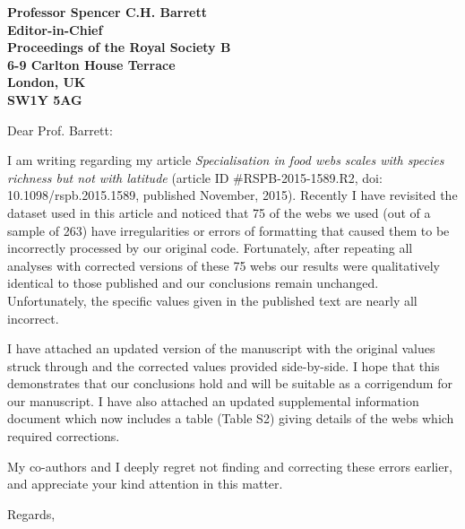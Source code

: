 \documentclass[12pt]{letter}
\begin{document}
\begin{letter}{\bf Professor Spencer C.H. Barrett\\
               Editor-in-Chief\\
               Proceedings of the Royal Society B\\
               6-9 Carlton House Terrace\\
               London, UK\\
               SW1Y 5AG\\
                }

\opening{Dear Prof. Barrett:}

I am writing regarding my article \emph{Specialisation in food webs scales with species richness but not with latitude} (article ID \#RSPB-2015-1589.R2, doi: 10.1098/rspb.2015.1589, published November, 2015). Recently I have revisited the dataset used in this article and noticed that 75  of the webs we used (out of a sample of 263) have irregularities or errors of formatting that caused them to be incorrectly processed by our original code. Fortunately, after repeating all analyses with corrected versions of these 75 webs our results were qualitatively identical to those published and our conclusions remain unchanged. Unfortunately, the specific values given in the published text are nearly all incorrect. 


I have attached an updated version of the manuscript with the original values struck through and the corrected values provided side-by-side. I hope that this demonstrates that our conclusions hold and will be suitable as a corrigendum for our manuscript. I have also attached an updated supplemental information document which now includes a table (Table S2) giving details of the webs which required corrections.


My co-authors and I deeply regret not finding and correcting these errors earlier, and appreciate your kind attention in this matter.


\closing{Regards,}


\end{letter}


\end{document}
